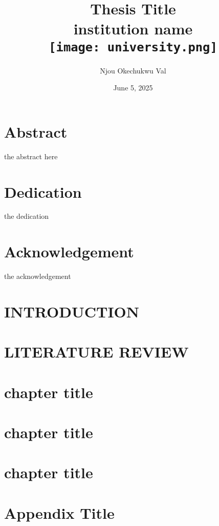\documentclass[12pt]{report}
\title{
	{Thesis Title}\\
	{\large institution name}\\
	{\texttt{[image: university.png]}}
}
\author{Njou Okechukwu Val}
\date{June 5, 2025}
\begin{document}
	
	
	\chapter*{Abstract}
	the abstract here 
	
	\chapter*{Dedication}
	the dedication
	
	\chapter*{Acknowledgement}
	the acknowledgement
	
	\tableofcontents
	\listoffigures
	\listoftables
	
	\chapter{INTRODUCTION}
	
	
	\chapter{LITERATURE REVIEW}
	
	
	\chapter{chapter title}
	
	
	\chapter{chapter title}
	
	
	\chapter{chapter title}
	
	
	\appendix
	\chapter*{Appendix Title}
	
	
	
	
\end{document}
